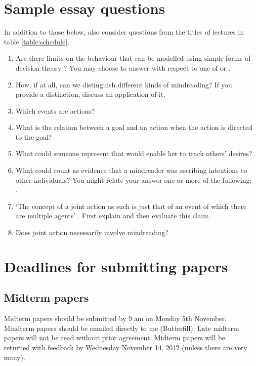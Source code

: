 \documentclass[12pt,\papersize]{extarticle}
\begin{document}
\section{Sample essay questions}
In addition to those below, also consider questions from the titles of lectures in table \vref{table:schedule}.
%
\begin{enumerate}
\item Are there limits on the behaviour that can be modelled using simple forms of decision theory \citep[such as the version presented in][]{Jeffrey:1983oe}?  You may choose to answer with respect to one of \citet{Sugden:2000mw} or \citet{bratman:2000_valuing}.
\item How, if at all, can we distinguish different kinds of mindreading?  If you provide a distinction, discuss an application of it.
\item Which events are actions?
\item What is the relation between a goal and an action when the action is directed to the goal?
\item What could someone represent that would enable her to track others' desires?
\item What could count as evidence that a mindreader was ascribing intentions to other individuals?  You might relate your answer one or more of the following: \citet{fogassi_mirror_2007,Dasser:1989qw,astington:2001_paradox,malle:2001_distinction}.
\item `The concept of a joint action as such is just that of an event of which there are multiple agents' \citep[p.\ 366]{ludwig_collective_2007}.  First explain and then evaluate this claim.
\item Does joint action necessarily involve mindreading?
\end{enumerate}


\section{Deadlines for submitting papers}

\subsection{Midterm papers}
Midterm papers should be submitted by 9 am on Monday 5th November.  Mindterm papers should be emailed directly to me (Butterfill).  Late midterm papers will not be read without prior agreement.  Midterm papers will be returned with feedback by Wednesday November 14, 2012 (unless there are very many).  
\end{document}
